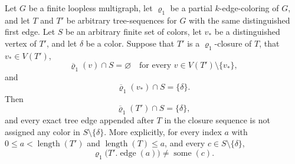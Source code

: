 \begin{lemma}
Let \(G\) be a finite loopless multigraph, let \(\varrho_1\) be a
partial \(k\)-edge-coloring of \(G\), and let \(T\) and \(T'\) be
arbitrary tree-sequences for \(G\) with the same distinguished first
edge.  Let \(S\) be an arbitrary finite set of colors, let \(v_*\) be a
distinguished vertex of \(T'\), and let \(\delta\) be a color.  Suppose
that \(T'\) is a \(\varrho_1\)-closure of \(T\), that \(v_*\in V(T')\),
\[
 \overline{\varrho}_1(v)\cap S=\varnothing
 \quad\text{for every }v\in V(T')\setminus\{v_*\},          \tag{19a}
\]
and
\[
              \overline{\varrho}_1(v_*)\cap S=\{\delta\}.    \tag{19b}
\]
Then
\[
             \overline{\varrho}_1(T')\cap S=\{\delta\},      \tag{19c}
\]
and every exact tree edge appended after \(T\) in the closure sequence is
not assigned any color in \(S\setminus\{\delta\}\).  More explicitly,
for every index \(a\) with
\(0\leq a<\operatorname{length}(T')\) and
\(\operatorname{length}(T)\leq a\), and every
\(c\in S\setminus\{\delta\}\),
\[
               \varrho_1\bigl(T'.\operatorname{edge}(a)\bigr)
                    \ne \operatorname{some}(c).              \tag{19d}
\]
\end{lemma}
